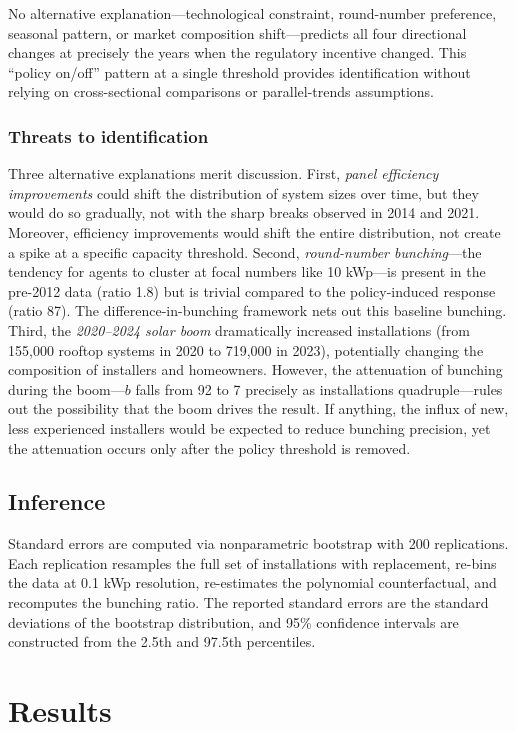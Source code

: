 \documentclass[12pt]{article}
\begin{document}
No alternative explanation---technological constraint, round-number preference, seasonal pattern, or market composition shift---predicts all four directional changes at precisely the years when the regulatory incentive changed. This ``policy on/off'' pattern at a single threshold provides identification without relying on cross-sectional comparisons or parallel-trends assumptions.

\subsubsection*{Threats to identification} Three alternative explanations merit discussion. First, \textit{panel efficiency improvements} could shift the distribution of system sizes over time, but they would do so gradually, not with the sharp breaks observed in 2014 and 2021. Moreover, efficiency improvements would shift the entire distribution, not create a spike at a specific capacity threshold. Second, \textit{round-number bunching}---the tendency for agents to cluster at focal numbers like 10 kWp---is present in the pre-2012 data (ratio 1.8) but is trivial compared to the policy-induced response (ratio 87). The difference-in-bunching framework nets out this baseline bunching. Third, the \textit{2020--2024 solar boom} dramatically increased installations (from 155,000 rooftop systems in 2020 to 719,000 in 2023), potentially changing the composition of installers and homeowners. However, the attenuation of bunching during the boom---$b$ falls from 92 to 7 precisely as installations quadruple---rules out the possibility that the boom drives the result. If anything, the influx of new, less experienced installers would be expected to reduce bunching precision, yet the attenuation occurs only after the policy threshold is removed.

\subsection{Inference}

Standard errors are computed via nonparametric bootstrap with 200 replications. Each replication resamples the full set of installations with replacement, re-bins the data at 0.1 kWp resolution, re-estimates the polynomial counterfactual, and recomputes the bunching ratio. The reported standard errors are the standard deviations of the bootstrap distribution, and 95\% confidence intervals are constructed from the 2.5th and 97.5th percentiles.


\section{Results}
\label{sec:results}
\end{document}
